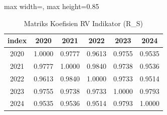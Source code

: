 \begin{table}[H]
\centering
\caption{Matriks Koefisien RV Indikator (R_S)} \label{tab:apprv_s}
\begin{adjustbox}{max width=\textwidth, max height=0.85\textheight}
\begin{tabular}{|c|c|c|c|c|c|}
\hline
\textbf{index} & \textbf{2020} & \textbf{2021} & \textbf{2022} & \textbf{2023} & \textbf{2024} \\
\hline
2020 & 1.0000 & 0.9777 & 0.9613 & 0.9755 & 0.9535 \\
2021 & 0.9777 & 1.0000 & 0.9840 & 0.9738 & 0.9536 \\
2022 & 0.9613 & 0.9840 & 1.0000 & 0.9733 & 0.9514 \\
2023 & 0.9755 & 0.9738 & 0.9733 & 1.0000 & 0.9793 \\
2024 & 0.9535 & 0.9536 & 0.9514 & 0.9793 & 1.0000 \\
\hline
\end{tabular}
\end{adjustbox}
\end{table}